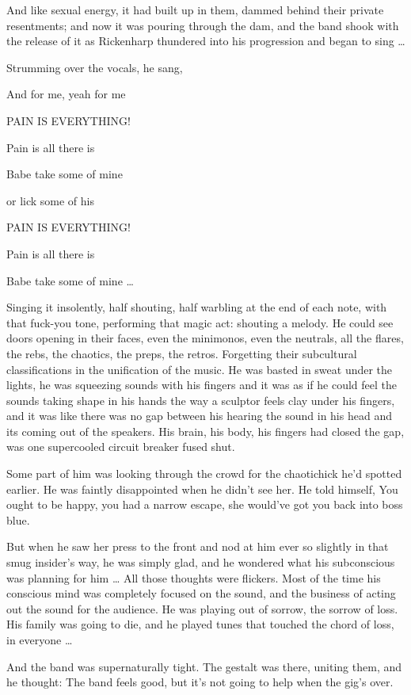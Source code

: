 And like sexual energy, it had built up in them, dammed behind their private resentments; and now it was pouring through the dam, and the band shook with the release of it as Rickenharp thundered into his progression and began to sing …

Strumming over the vocals, he sang,

And for me, yeah for me

PAIN IS EVERYTHING!

Pain is all there is

Babe take some of mine

or lick some of his

PAIN IS EVERYTHING!

Pain is all there is

Babe take some of mine …

Singing it insolently, half shouting, half warbling at the end of each note, with that fuck-you tone, performing that magic act: shouting a melody. He could see doors opening in their faces, even the minimonos, even the neutrals, all the flares, the rebs, the chaotics, the preps, the retros. Forgetting their subcultural classifications in the unification of the music. He was basted in sweat under the lights, he was squeezing sounds with his fingers and it was as if he could feel the sounds taking shape in his hands the way a sculptor feels clay under his fingers, and it was like there was no gap between his hearing the sound in his head and its coming out of the speakers. His brain, his body, his fingers had closed the gap, was one supercooled circuit breaker fused shut.

Some part of him was looking through the crowd for the chaotichick he’d spotted earlier. He was faintly disappointed when he didn’t see her. He told himself, You ought to be happy, you had a narrow escape, she would’ve got you back into boss blue.

But when he saw her press to the front and nod at him ever so slightly in that smug insider’s way, he was simply glad, and he wondered what his subconscious was planning for him … All those thoughts were flickers. Most of the time his conscious mind was completely focused on the sound, and the business of acting out the sound for the audience. He was playing out of sorrow, the sorrow of loss. His family was going to die, and he played tunes that touched the chord of loss, in everyone …

And the band was supernaturally tight. The gestalt was there, uniting them, and he thought: The band feels good, but it’s not going to help when the gig’s over.

